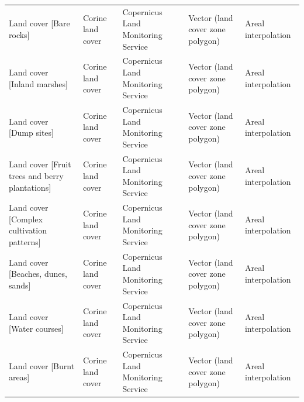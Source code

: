 \documentclass[fleqn,10pt]{wlscirep}
\begin{document}
\begin{longtable}{p{}p{}p{}p{}p{}}
                                                                                Land cover [Bare rocks] &                  Corine land cover  &                                         Copernicus Land Monitoring Service  &  Vector (land cover zone polygon)  &                            Areal interpolation  \\
                                                                            Land cover [Inland marshes] &                  Corine land cover  &                                         Copernicus Land Monitoring Service  &  Vector (land cover zone polygon)  &                            Areal interpolation  \\
                                                                                Land cover [Dump sites] &                  Corine land cover  &                                         Copernicus Land Monitoring Service  &  Vector (land cover zone polygon)  &                            Areal interpolation  \\
                                                            Land cover [Fruit trees and berry plantations] &                  Corine land cover  &                                         Copernicus Land Monitoring Service  &  Vector (land cover zone polygon)  &                            Areal interpolation  \\
                                                                Land cover [Complex cultivation patterns] &                  Corine land cover  &                                         Copernicus Land Monitoring Service  &  Vector (land cover zone polygon)  &                            Areal interpolation  \\
                                                                        Land cover [Beaches, dunes, sands] &                  Corine land cover  &                                         Copernicus Land Monitoring Service  &  Vector (land cover zone polygon)  &                            Areal interpolation  \\
                                                                                Land cover [Water courses] &                  Corine land cover  &                                         Copernicus Land Monitoring Service  &  Vector (land cover zone polygon)  &                            Areal interpolation  \\
                                                                                Land cover [Burnt areas] &                  Corine land cover  &                                         Copernicus Land Monitoring Service  &  Vector (land cover zone polygon)  &                            Areal interpolation  \\

\end{longtable}
\end{document}

